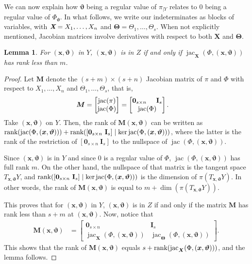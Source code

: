\documentclass[12pt]{article}
\def\Xb{\textit{\textbf{X}}}
\def\Thetab{\bm{\Theta}}
\def\thetab{\bm{\vartheta}}
\def\xb{{\bm x}}
\DeclareMathOperator{\jac}{jac}
\def\dt{s}
\def\bbm{\begin{bmatrix}}
\def\ebm{\end{bmatrix}}
\newtheorem{lemma}[theorem]{Lemma}
\begin{document}
\noindent 
We can now explain how $\thetab$ being a regular value of $\pi_{|Y}$
relates to $0$ being a regular value of $\Phi_{\thetab}$.  In what
follows, we write our indeterminates as blocks of variables, with
$\Xb=X_1,\dots,X_n$ and $\Thetab = \Theta_1,\dots,\Theta_s$. When 
not explicitly mentioned, Jacobian matrices involve derivatives
with respect to both $\bm X$ and $\bm \Theta$.

\begin{lemma}\label{prop:rankJ}
  For $(\xb,\thetab)$ in $Y$, $(\xb,\thetab)$ is in $Z$ if and only if
  $\jac_{\bm X}(\Phi,(\xb,\thetab))$ has rank less than $m$.
\end{lemma}
\begin{proof}
  Let $\bm M$ denote the $(s+m) \times (s+n)$ Jacobian matrix of $\pi$
  and $\Phi$ with respect to $X_1,\dots,X_n$ and
  $\Theta_1,\dots,\Theta_s$, that is,
  \begin{align*}
    \bm M &= 
    \bbm 
    \jac(\pi)\\
    \jac(\Phi) 
    \ebm 
    =
    \bbm 
    \textbf{0}_{\dt \times n}\hspace{5mm}\textbf{I}_{\dt} \\
    \jac(\Phi)
    \ebm.
  \end{align*}
  Take $(\xb,\thetab)$ on $Y$. Then, the rank of $\bm M(\xb,\thetab)$
  can be written as $\textup{rank}(\jac(\Phi,(\xb,\thetab))) +
  \textup{rank}([\textbf{0}_{\dt \times n}~\textbf{I}_{\dt}] \mid \ker
   \jac(\Phi,(\xb,\thetab)))$, where the latter is the rank of the
  restriction of $[\textbf{0}_{\dt \times n}~\textbf{I}_{\dt}]$ to the
  nullspace of $\jac(\Phi,(\xb,\thetab))$.

  Since $(\xb,\thetab)$ is in $Y$ and since $0$ is a regular value of
  $\Phi$, $\jac (\Phi,(\xb,\thetab))$ has full rank $m$. On the other
  hand, the nullspace of that matrix is the tangent space
  $T_{\xb,\thetab} Y$, and $\textup{rank}([\textbf{0}_{\dt \times
      n}~\textbf{I}_{\dt}] \mid \ker \jac(\Phi,(\xb,\thetab)))$ is the
  dimension of $\pi(T_{\xb,\thetab} Y)$.  In other words, the rank of
  $\bm M(\xb,\thetab)$ is equal to $m+\dim(\pi(T_{\xb,\thetab} Y))$.

  This proves that for $(\xb,\thetab)$ in $Y$, $(\xb,\thetab)$ is in
  $Z$ if and only if the matrix $\bm M$ has rank less than $\dt+m$ at
  $(\xb,\thetab)$. Now, notice that
  \begin{align*}
   \bm M(\xb,\thetab)&= 
    \bbm 
    \textbf{0}_{\dt \times n} &\textbf{I}_{\dt} \\
     \jac_{\bm X}(\Phi,(\xb,\thetab))     &\jac_{\bm \Theta}(\Phi, (\xb,\thetab))
    \ebm.
  \end{align*}
  This shows that the rank of $\bm M(\xb,\thetab)$ 
  equals $s + \textup{rank}(\jac_{\bm X}(\Phi,(\xb,\thetab)))$,
  and  the lemma follows.
\end{proof}
\end{document}
